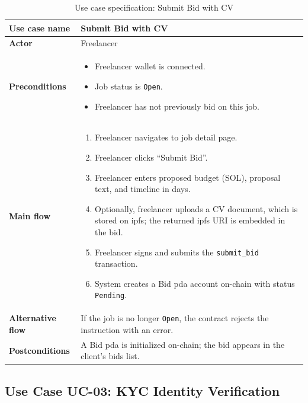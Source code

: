 \begin{table}[H]
\centering
\caption{Use case specification: Submit Bid with CV}
\label{table:uc02}
\begin{tabular}{|l|p{10cm}|}
\hline
\textbf{Use case name} & Submit Bid with CV \\ \hline
\textbf{Actor} & Freelancer \\ \hline
\textbf{Preconditions} & \begin{itemize}[noitemsep]
    \item Freelancer wallet is connected.
    \item Job status is \texttt{Open}.
    \item Freelancer has not previously bid on this job.
\end{itemize} \\ \hline
\textbf{Main flow} & \begin{enumerate}[noitemsep]
    \item Freelancer navigates to job detail page.
    \item Freelancer clicks ``Submit Bid''.
    \item Freelancer enters proposed budget (SOL), proposal text, and timeline in days.
    \item Optionally, freelancer uploads a CV document, which is stored on \gls{ipfs}; the returned \gls{ipfs} URI is embedded in the bid.
    \item Freelancer signs and submits the \texttt{submit\_bid} transaction.
    \item System creates a Bid \gls{pda} account on-chain with status \texttt{Pending}.
\end{enumerate} \\ \hline
\textbf{Alternative flow} & If the job is no longer \texttt{Open}, the contract rejects the instruction with an error. \\ \hline
\textbf{Postconditions} & A Bid \gls{pda} is initialized on-chain; the bid appears in the client's bids list. \\ \hline
\end{tabular}
\end{table}

\subsection{Use Case UC-03: KYC Identity Verification}
\label{subsection:uc03}


